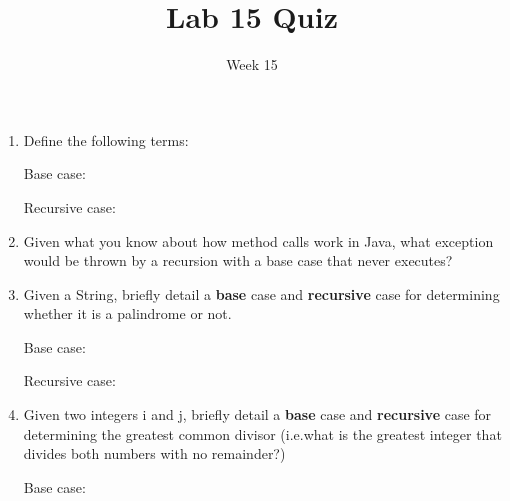 \documentclass[addpoints]{exam}
\title{Lab 15 Quiz}
\date{Week 15}
\begin{document}
 

\Instructions
\begin{enumerate}
\newline
\item {}
Define the following terms:

\begin{oneparchoices} 
\hspace{0.2cm}
 \vspace{2em}
 \choice Base case: \newline  \newline
 
 \choice Recursive case:  \newline
 
 \end{oneparchoices}
 

 
 
 \item {}
Given what you know about how method calls work in Java, what exception would be thrown by a recursion with a base case that never executes?

 \vspace{2em}

 \vspace{2em}

 \item {}
Given a String, briefly detail a \textbf{base} case and \textbf{recursive} case for determining whether it is a palindrome or not.

\begin{oneparchoices} 
\hspace{0.2cm}
 \vspace{2em}
 \choice Base case: 

 \vspace{1em}\newline
 \choice Recursive case: 
 
 \newline \newline
 
\end{oneparchoices}

 \item {}
Given two integers i and j, briefly detail a \textbf{base} case and \textbf{recursive} case for determining the greatest common divisor (i.e.what is the greatest integer that divides both numbers with no remainder?)

\begin{oneparchoices} 
\hspace{0.2cm}
\vspace{2em}
 \choice Base case:  
 


\end{oneparchoices}
\end{enumerate}
\end{document}

